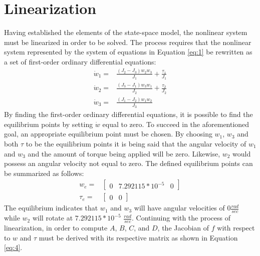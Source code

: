 \documentclass[12pt]{article}
\begin{document}
\section{Linearization}
Having established the elements of the state-space model, the nonlinear system must be linearized in order to be solved. The process requires that the nonlinear system represented by the system of equations in Equation \ref{eq:1} be rewritten as a set of first-order ordinary differential equations:
\begin{equation}
\label{eq:2} 
\begin{aligned}
\dot{w}_{1} = & \frac{(J_{2}-J_{3})w_{2}w_{3}}{J_{1}}+\frac{\tau_{1}}{J_{1}}\\
\dot{w}_{2} = & \frac{(J_{3}-J_{1})w_{3}w_{1}}{J_{2}}+\frac{\tau_{2}}{J_{2}}\\
\dot{w}_{3} = & \frac{(J_{1}-J_{2})w_{1}w_{2}}{J_{3}}
\end{aligned}
\end{equation}
By finding the first-order ordinary differential equations, it is possible to find the equilibrium points by setting $\dot{w}$ equal to zero. To succeed in the aforementioned goal, an appropriate equilibrium point must be chosen. By choosing $w_{1}$, $w_{3}$ and both $\tau$ to be the equilibrium points it is being said that the angular velocity of $w_{1}$ and $w_{3}$ and the amount of torque being applied will be zero. Likewise, $w_{2}$ would possess an angular velocity not equal to zero. The defined equilibrium points can be summarized as follows:
\begin{equation}
\label{eq:3} 
\begin{aligned}
{w}_{e} = &\begin{bmatrix}
0 & 7.292115*10^{-5} & 0
\end{bmatrix}\\
\tau_{e} = &\begin{bmatrix}
0  & 0
\end{bmatrix}
\end{aligned}
\end{equation}
The equilibrium indicates that $w_{1}$ and $w_{3}$ will have angular velocities of 0\( \frac{rad}{sec} \) while $w_{2}$ will rotate at $7.292115*10^{-5}$ \( \frac{rad}{sec} \). Continuing with the process of linearization, in order to compute $A$, $B$, $C$, and $D$, the Jacobian of $f$ with respect to $w$ and $\tau$ must be derived with its respective matrix as shown in Equation \ref{eq:4}.
\\ \\
\end{document}
